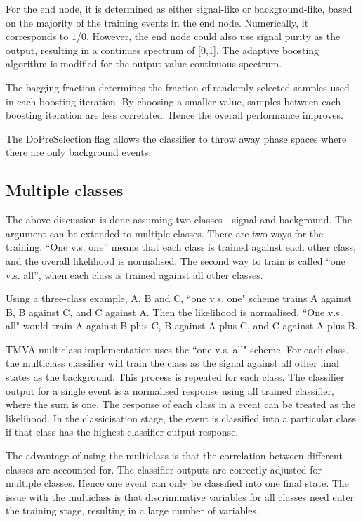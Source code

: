 For the end node, it is determined as either signal-like or background-like, based on the majority of the training events in the end node. Numerically, it corresponds to 1/0. However, the end node could also use signal purity as the output, resulting in a continues spectrum of [0,1]. The adaptive boosting algorithm is modified for the output value continuous spectrum.

The bagging fraction determines the fraction of randomly selected samples used in each boosting iteration. By choosing a smaller value, samples between each boosting iteration are less correlated. Hence the overall performance improves.

The DoPreSelection flag allows the classifier to throw away phase spaces where there are only background events.

\subsection{Multiple classes}
\label{sec:pandoraMVAmulticlass}

The above discussion is done assuming two classes - signal and background. The argument can be extended to multiple classes. There are two ways for the training. ``One v.s. one'' means that each class is trained against each other class, and the overall likelihood is normalised. The second way to train is called ``one v.s. all'', when each class is trained against all other classes.

Using a three-class example, A, B and C, ``one v.s. one" scheme trains A against B, B against C, and C against A. Then the likelihood is normalised. ``One v.s. all" would train A against B plus C, B against A plus C, and C against A plus B.

TMVA multiclass implementation uses the ``one v.s. all" scheme. For each class, the multiclass classifier will train the class as the signal against all other final states as the background. This process is repeated for each class. The classifier output for a single event is a normalised response using all trained classifier, where the sum is one. The response of each class in a event can be treated as the likelihood. In the classicisation stage, the event is classified into a particular class if that class has the highest classifier output response.

The advantage of using the multiclass is that the correlation between different classes are accounted for. The classifier outputs are correctly adjusted for multiple classes. Hence one event can only be classified into one final state. The issue with the multiclass is that discriminative variables for all classes need enter the training stage, resulting in a large number of variables.


